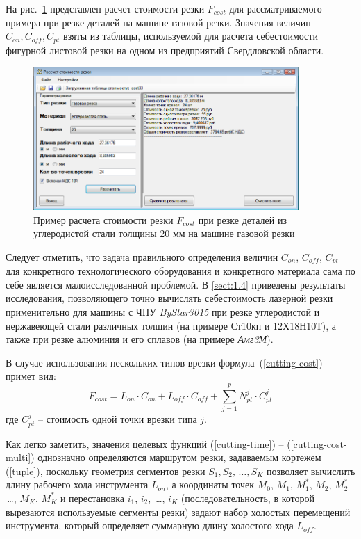 \documentclass[11pt,twoside,openany]{report}
\begin{document}
На рис.~\ref{cost} представлен расчет стоимости резки
$F_{cost}$
для рассматриваемого примера при резке деталей на машине газовой резки.
Значения величин
$C_{on}, C_{off}, C_{pt}$
взяты из таблицы, используемой для расчета себестоимости фигурной
листовой резки на одном из предприятий Свердловской области.

\begin{figure}[h]
  \begin{center}
  \includegraphics[width=0.9\textwidth]{cost.png}
  \caption{
    Пример расчета стоимости резки $F_{cost}$
    при резке деталей из углеродистой стали
    толщины 20 мм на машине газовой резки}
  \label{cost}
  \end{center}
\end{figure}

Следует отметить,
что задача правильного определения величин
$C_{on}$, $C_{off}$, $C_{pt}$
для конкретного технологического оборудования
и конкретного материала сама по себе является малоисследованной проблемой.
В \ref{sect:1.4}
приведены результаты исследования,
позволяющего точно вычислять себестоимость
лазерной резки применительно для машины с ЧПУ
\textit{ByStar3015}
при резке углеродистой и нержавеющей
стали различных толщин
(на примере Ст10кп и 12Х18Н10Т),
а также при резке алюминия и его сплавов
(на примере \textit{Амг3М}).

В случае использования нескольких типов врезки формула~(\ref{cutting-cost}) примет вид:
\begin{equation}
  F_{cost}=
  L_{on} \cdot C_{on} +
  L_{off} \cdot C_{off} +
  \sum_{j=1}^p N_{pt}^j \cdot C_{pt}^j
  \label{cutting-cost-multi}
\end{equation}
где $C_{pt}^j$ -- стоимость одной точки врезки типа $j$.

Как легко заметить,
значения целевых функций (\ref{cutting-time}) -- (\ref{cutting-cost-multi})
однозначно определяются маршрутом резки,
задаваемым кортежем (\ref{tuple}),
поскольку геометрия сегментов резки
$S_1, S_2, \,\dots, S_K$
позволяет вычислить длину рабочего хода инструмента  $L_{on}$,
а координаты точек
$M_0$, $M_1$, $M_1^*$, $M_2$, $M_2^*$ \,\dots, $M_K$, $M_K^*$
и перестановка
$i_1$, $i_2$, \,\dots, $i_K$
(последовательность, в которой вырезаются используемые сегменты резки)
задают набор холостых перемещений инструмента,
который определяет суммарную длину холостого хода
$L_{off}$.
\end{document}
